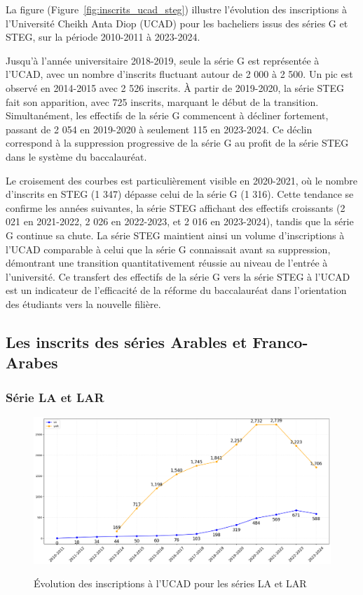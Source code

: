 La figure (Figure~\ref{fig:inscrits_ucad_steg}) illustre l'évolution des inscriptions à l'Université Cheikh Anta Diop (UCAD) pour les bacheliers issus des séries G et STEG, sur la période 2010-2011 à 2023-2024.

Jusqu'à l'année universitaire 2018-2019, seule la série G est représentée à l'UCAD, avec un nombre d'inscrits fluctuant autour de 2 000 à 2 500. Un pic est observé en 2014-2015 avec 2 526 inscrits. 
À partir de 2019-2020, la série STEG fait son apparition, avec 725 inscrits, marquant le début de la transition. Simultanément, les effectifs de la série G commencent à décliner fortement, passant de 2 054 en 2019-2020 à seulement 115 en 2023-2024. 
Ce déclin correspond à la suppression progressive de la série G au profit de la série STEG dans le système du baccalauréat.

Le croisement des courbes est particulièrement visible en 2020-2021, où le nombre d'inscrits en STEG (1 347) dépasse celui de la série G (1 316). 
Cette tendance se confirme les années suivantes, la série STEG affichant des effectifs croissants (2 021 en 2021-2022, 2 026 en 2022-2023, et 2 016 en 2023-2024), tandis que la série G continue sa chute. 
La série STEG maintient ainsi un volume d'inscriptions à l'UCAD comparable à celui que la série G connaissait avant sa suppression, démontrant une transition quantitativement réussie au niveau de l'entrée à l'université. 
Ce transfert des effectifs de la série G vers la série STEG à l'UCAD est un indicateur de l'efficacité de la réforme du baccalauréat dans l'orientation des étudiants vers la nouvelle filière.

\newpage
\subsection{Les inscrits des séries Arables et Franco-Arabes}

\subsubsection{Série LA et LAR}

\begin{figure}[ht]
\centering
\caption{Évolution des inscriptions à l'UCAD pour les séries LA et LAR}
\includegraphics[width=1\textwidth]{figure/Inscrits_ucad_LA_LAR.png}
\label{fig:inscrits_ucad_la_lar}
\end{figure}

